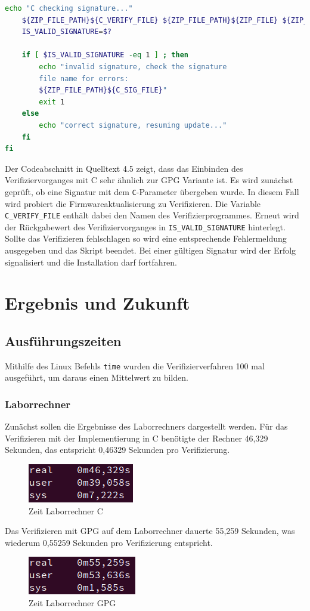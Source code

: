 \documentclass[thesis=bachelor,faculty=cb]{hsmw-thesis}
\begin{document}
{\begin{lstlisting}[language=bash, caption={C Verifizierung icsupdate.sh}]
	echo "C checking signature..."
	${ZIP_FILE_PATH}${C_VERIFY_FILE} ${ZIP_FILE_PATH}${ZIP_FILE} ${ZIP_FILE_PATH}${C_SIG_FILE}
	IS_VALID_SIGNATURE=$?

	if [ $IS_VALID_SIGNATURE -eq 1 ] ; then
		echo "invalid signature, check the signature 
		file name for errors: 
		${ZIP_FILE_PATH}${C_SIG_FILE}"
		exit 1
	else
		echo "correct signature, resuming update..."
	fi
fi
\end{lstlisting}
Der Codeabschnitt in Quelltext 4.5 zeigt, dass das Einbinden des Verifiziervorganges mit C sehr ähnlich zur GPG Variante ist. Es wird zunächst geprüft, ob eine Signatur mit dem \texttt{C}-Parameter übergeben wurde. In diesem Fall wird probiert die Firmwareaktualisierung zu Verifizieren. Die Variable \texttt{C\_VERIFY\_FILE} enthält dabei den Namen des Verifizierprogrammes. Erneut wird der Rückgabewert des Verifiziervorganges in \texttt{IS\_VALID\_SIGNATURE} hinterlegt. Sollte das Verifizieren fehlschlagen so wird eine entsprechende Fehlermeldung ausgegeben und das Skript beendet. Bei einer gültigen Signatur wird der Erfolg signalisiert und die Installation darf fortfahren.
\chapter{Ergebnis und Zukunft}
\section{Ausführungszeiten}

\noindent
Mithilfe des Linux Befehls \texttt{time} wurden die Verifizierverfahren 100 mal ausgeführt, um daraus einen Mittelwert zu bilden.
\\[1cm]
\subsection*{Laborrechner}
Zunächst sollen die Ergebnisse des Laborrechners dargestellt werden. Für das Verifizieren mit der Implementierung in C benötigte der Rechner 46,329 Sekunden, das entspricht 0,46329 Sekunden pro Verifizierung.
\begin{figure}[H]
	\centering
	\includegraphics[scale=0.8]{images/Laborrechner_C.PNG}
	\caption{Zeit Laborrechner C}
\end{figure}
\noindent
Das Verifizieren mit GPG auf dem Laborrechner dauerte 55,259 Sekunden, was wiederum 0,55259 Sekunden pro Verifizierung entspricht.
\begin{figure}[H]
	\centering
	\includegraphics[scale=0.8]{images/Laborrechner_GPG.PNG}
	\caption{Zeit Laborrechner GPG}
\end{figure}
\newpage
}
\end{document}
